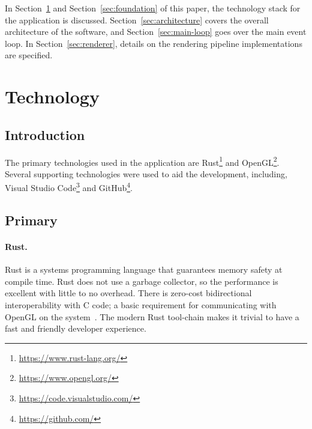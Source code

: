 In Section~\ref{sec:technology} and Section~\ref{sec:foundation} of this paper, the technology stack for the application is discussed.
Section~\ref{sec:architecture} covers the overall architecture of the software, and Section~\ref{sec:main-loop} goes over the main event loop.
In Section~\ref{sec:renderer}, details on the rendering pipeline implementations are specified.


\section{Technology}\label{sec:technology}

\subsection{Introduction}
The primary technologies used in the application are Rust\footnote{\url{https://www.rust-lang.org/}} and OpenGL\footnote{\url{https://www.opengl.org/}}.
Several supporting technologies were used to aid the development, including, Visual Studio Code\footnote{\url{https://code.visualstudio.com/}} and GitHub\footnote{\url{https://github.com/}}.

\subsection{Primary}

\paragraph{Rust. }
Rust is a systems programming language that guarantees memory safety at compile time.
Rust does not use a garbage collector, so the performance is excellent with little to no overhead.
There is zero-cost bidirectional interoperability with C code;
a basic requirement for communicating with OpenGL on the system~\autocite{rust_programming_language_rust_2020}.
The modern Rust tool-chain makes it trivial to have a fast and friendly developer experience.

